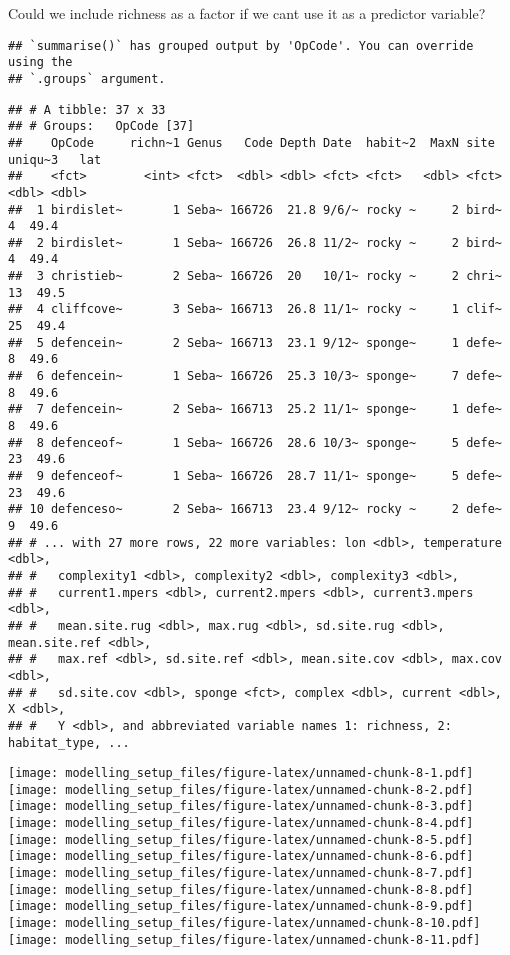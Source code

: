 \documentclass[
]{article}
\begin{document}
Could we include richness as a factor if we cant use it as a predictor
variable?

\begin{verbatim}
## `summarise()` has grouped output by 'OpCode'. You can override using the
## `.groups` argument.
\end{verbatim}

\begin{verbatim}
## # A tibble: 37 x 33
## # Groups:   OpCode [37]
##    OpCode     richn~1 Genus   Code Depth Date  habit~2  MaxN site  uniqu~3   lat
##    <fct>        <int> <fct>  <dbl> <dbl> <fct> <fct>   <dbl> <fct>   <dbl> <dbl>
##  1 birdislet~       1 Seba~ 166726  21.8 9/6/~ rocky ~     2 bird~       4  49.4
##  2 birdislet~       1 Seba~ 166726  26.8 11/2~ rocky ~     2 bird~       4  49.4
##  3 christieb~       2 Seba~ 166726  20   10/1~ rocky ~     2 chri~      13  49.5
##  4 cliffcove~       3 Seba~ 166713  26.8 11/1~ rocky ~     1 clif~      25  49.4
##  5 defencein~       2 Seba~ 166713  23.1 9/12~ sponge~     1 defe~       8  49.6
##  6 defencein~       1 Seba~ 166726  25.3 10/3~ sponge~     7 defe~       8  49.6
##  7 defencein~       2 Seba~ 166713  25.2 11/1~ sponge~     1 defe~       8  49.6
##  8 defenceof~       1 Seba~ 166726  28.6 10/3~ sponge~     5 defe~      23  49.6
##  9 defenceof~       1 Seba~ 166726  28.7 11/1~ sponge~     5 defe~      23  49.6
## 10 defenceso~       2 Seba~ 166713  23.4 9/12~ rocky ~     2 defe~       9  49.6
## # ... with 27 more rows, 22 more variables: lon <dbl>, temperature <dbl>,
## #   complexity1 <dbl>, complexity2 <dbl>, complexity3 <dbl>,
## #   current1.mpers <dbl>, current2.mpers <dbl>, current3.mpers <dbl>,
## #   mean.site.rug <dbl>, max.rug <dbl>, sd.site.rug <dbl>, mean.site.ref <dbl>,
## #   max.ref <dbl>, sd.site.ref <dbl>, mean.site.cov <dbl>, max.cov <dbl>,
## #   sd.site.cov <dbl>, sponge <fct>, complex <dbl>, current <dbl>, X <dbl>,
## #   Y <dbl>, and abbreviated variable names 1: richness, 2: habitat_type, ...
\end{verbatim}

\texttt{[image: modelling\_setup\_files/figure-latex/unnamed-chunk-8-1.pdf]}
\texttt{[image: modelling\_setup\_files/figure-latex/unnamed-chunk-8-2.pdf]}
\texttt{[image: modelling\_setup\_files/figure-latex/unnamed-chunk-8-3.pdf]}
\texttt{[image: modelling\_setup\_files/figure-latex/unnamed-chunk-8-4.pdf]}
\texttt{[image: modelling\_setup\_files/figure-latex/unnamed-chunk-8-5.pdf]}
\texttt{[image: modelling\_setup\_files/figure-latex/unnamed-chunk-8-6.pdf]}
\texttt{[image: modelling\_setup\_files/figure-latex/unnamed-chunk-8-7.pdf]}
\texttt{[image: modelling\_setup\_files/figure-latex/unnamed-chunk-8-8.pdf]}
\texttt{[image: modelling\_setup\_files/figure-latex/unnamed-chunk-8-9.pdf]}
\texttt{[image: modelling\_setup\_files/figure-latex/unnamed-chunk-8-10.pdf]}
\texttt{[image: modelling\_setup\_files/figure-latex/unnamed-chunk-8-11.pdf]}
\end{document}

